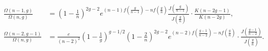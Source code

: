 \documentclass[10pt,a4paper]{amsart}
\begin{document}
\begin{align}
    \frac{\Omega(n-1,g)}{\Omega(n,g)}
        &= \left(1-\frac{1}{n}\right)^{2g-2} e^{(n-1)f(\frac{g}{n-1})-nf(\frac{g}{n})} \frac{{J}\left(\frac{g}{n-1}\right)}{{J}\left(\frac{g}{n}\right)} \cdot \frac{K(n-2g-1)}{ K(n-2g)} , \label{eq:Omega_alpha_quot}\\
    \frac{\Omega(n-2,g-1)}{\Omega(n,g)} 
        &=  \frac{e}{(n-2)^2}
            \left(1-\frac{1}{g}\right)^{g-1/2}
            \left(1-\frac{2}{n}\right)^{2g-2}
            e^{(n-2)f(\frac{g-1}{n-2})-nf(\frac{g}{n})}  
            \cdot \frac{{J}\left(\frac{g-1}{n-2}\right)}{{J}\left(\frac{g}{n}\right)}. \label{eq:Omega_beta_quot}
\end{align}
\end{document}
